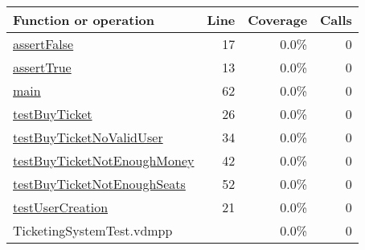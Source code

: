 \bigskip
\begin{longtable}{|l|r|r|r|}
\hline
Function or operation & Line & Coverage & Calls \\
\hline
\hline
\hyperref[assertFalse:17]{assertFalse} & 17&0.0\% & 0 \\
\hline
\hyperref[assertTrue:13]{assertTrue} & 13&0.0\% & 0 \\
\hline
\hyperref[main:62]{main} & 62&0.0\% & 0 \\
\hline
\hyperref[testBuyTicket:26]{testBuyTicket} & 26&0.0\% & 0 \\
\hline
\hyperref[testBuyTicketNoValidUser:34]{testBuyTicketNoValidUser} & 34&0.0\% & 0 \\
\hline
\hyperref[testBuyTicketNotEnoughMoney:42]{testBuyTicketNotEnoughMoney} & 42&0.0\% & 0 \\
\hline
\hyperref[testBuyTicketNotEnoughSeats:52]{testBuyTicketNotEnoughSeats} & 52&0.0\% & 0 \\
\hline
\hyperref[testUserCreation:21]{testUserCreation} & 21&0.0\% & 0 \\
\hline
\hline
TicketingSystemTest.vdmpp & & 0.0\% & 0 \\
\hline
\end{longtable}

